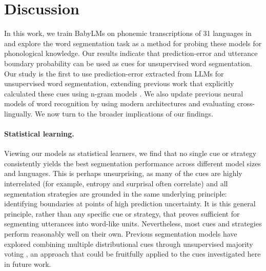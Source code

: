 
\section{Discussion}

In this work, we train BabyLMs on phonemic transcriptions of 31 languages in \ipachildes and explore the word segmentation task as a method for probing these models for phonological knowledge. Our results indicate that prediction-error and utterance boundary probability can be used as cues for unsupervised word segmentation. Our study is the first to use prediction-error extracted from LLMs for unsupervised word segmentation, extending previous work that explicitly calculated these cues using n-gram models \citep{ccoltekin2014explicit, Coltekin2017, goriely2023word}. We also update previous neural models of word recognition \citep{elman-1990-finding, christiansen1998learning} by using modern architectures and evaluating cross-lingually. We now turn to the broader implications of our findings.

\paragraph{Statistical learning.} Viewing our models as statistical learners, we find that no single cue or strategy consistently yields the best segmentation performance across different model sizes and languages. This is perhaps unsurprising, as many of the cues are highly interrelated (for example, entropy and surprisal often correlate) and all segmentation strategies are grounded in the same underlying principle: identifying boundaries at points of high prediction uncertainty. It is this general principle, rather than any specific cue or strategy, that proves sufficient for segmenting utterances into word-like units. Nevertheless, most cues and strategies perform reasonably well on their own. Previous segmentation models have explored combining multiple distributional cues through unsupervised majority voting \citep{Coltekin2017, goriely2023word}, an approach that could be fruitfully applied to the cues investigated here in future work.

